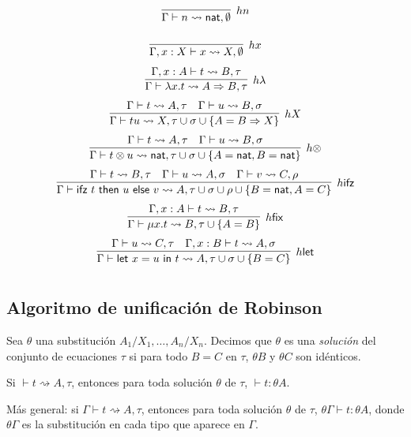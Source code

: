 \documentclass[twoside,a4paper,12pt]{article}
\theoremstyle{definition}
\theoremstyle{remark}
\newcommand\fix[2]{\ensuremath{\mathsf{\mu}#1.#2}}
\newcommand\fun[2]{\ensuremath{\lambda {#1}{.}{#2}}}
\newcommand\ifz[3]{\ensuremath{\mathsf{ifz~}#1\mathsf{~then~}#2\mathsf{~else~}#3}}
\newcommand\letl[3]{\ensuremath{\mathsf{let~}#1=#2\mathsf{~in~}#3}}
\newcommand\nat{\ensuremath{\mathsf{nat}}}
\begin{document}
\[\arraycolsep=10pt\def\arraystretch{2.6}
  \begin{array}{cc}
  \infer[hn]{\Gamma\vdash n\rightsquigarrow\nat,\emptyset}{} \\
  \infer[hx]{\Gamma,x:X\vdash x\rightsquigarrow X,\emptyset}{} \\
  \infer[h\lambda]
      {\Gamma\vdash\fun xt\rightsquigarrow A\Rightarrow B,\tau}
      {\Gamma,x:A\vdash t\rightsquigarrow B,\tau} \\
  \infer[hX]
      {\Gamma\vdash tu\rightsquigarrow X,\tau\cup\sigma\cup\{A=B\Rightarrow X\}}
      {\Gamma\vdash t\rightsquigarrow A,\tau & \Gamma\vdash u\rightsquigarrow B,\sigma } \\
  \infer[h\otimes]
      {\Gamma\vdash t\otimes u\rightsquigarrow\nat,\tau\cup\sigma\cup\{A=\nat,B=\nat\}}
      {\Gamma\vdash t\rightsquigarrow A,\tau & \Gamma\vdash u\rightsquigarrow B,\sigma } \\
  \infer[h\mathsf{ifz}]
      {\Gamma\vdash\ifz tuv\rightsquigarrow A,\tau\cup\sigma\cup\rho\cup\{B=\nat,A=C\}}
      {   \Gamma\vdash t\rightsquigarrow B,\tau
        & \Gamma\vdash u\rightsquigarrow A,\sigma
        & \Gamma\vdash v\rightsquigarrow C,\rho } \\
  \infer[h\mathsf{fix}]
      {\Gamma\vdash\fix xt\rightsquigarrow B,\tau\cup\{A=B\}}
      {\Gamma,x:A\vdash t\rightsquigarrow B,\tau} \\
  \infer[h\mathsf{let}]
      {\Gamma\vdash\letl xut\rightsquigarrow A,\tau\cup\sigma\cup\{B=C\}}
      {\Gamma\vdash u\rightsquigarrow C,\tau & \Gamma,x:B\vdash t\rightsquigarrow A,\sigma}
  \end{array}
\]
    
\subsection*{Algoritmo de unificación de Robinson}
\begin{definicion}
  Sea $\theta$ una substitución $A_1/X_1,\dots,A_n/X_n$. Decimos que $\theta$ es
  una \emph{solución} del conjunto de ecuaciones $\tau$ si para todo $B=C$ en
  $\tau$, $\theta B$ y $\theta C$ son idénticos.
\end{definicion}

\begin{teorema}
  Si $\vdash t\rightsquigarrow A,\tau$, entonces para toda solución $\theta$ de
  $\tau$, $\vdash t:\theta A$.

  Más general: si $\Gamma\vdash t\rightsquigarrow A,\tau$, entonces para toda
  solución $\theta$ de $\tau$, $\theta\Gamma\vdash t:\theta A$, donde
  $\theta\Gamma$ es la substitución en cada tipo que aparece en $\Gamma$.
\end{teorema}
\end{document}
